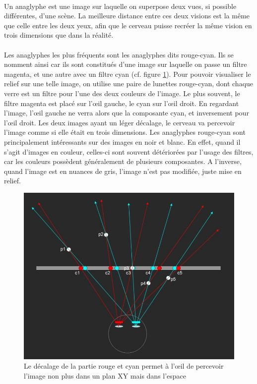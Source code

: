 \paragraph{}
	Un anaglyphe est une image sur laquelle on superpose deux vues, si possible différentes, d’une scène. La meilleure distance entre ces deux visions est la même que celle entre les deux yeux, afin que le cerveau puisse recréer la même vision en trois dimensions que dans la réalité.
	
\paragraph{}
	Les anaglyphes les plus fréquents sont les anaglyphes dits rouge-cyan. Ils se nomment ainsi car ils sont constitués d’une image sur laquelle on passe un filtre magenta, et une autre avec un filtre cyan (cf. figure \ref{fig:anaglyph}). Pour pouvoir visualiser le relief sur une telle image, on utilise une paire de lunettes rouge-cyan, dont chaque verre est un filtre pour l’une des deux couleurs de l’image. Le plus souvent, le filtre magenta est placé sur l’œil gauche, le cyan sur l’œil droit. En regardant l’image, l’œil gauche ne verra alors que la composante cyan, et inversement pour l’œil droit. Les deux images ayant un léger décalage, le cerveau va percevoir l’image comme si elle était en trois dimensions. Les anaglyphes rouge-cyan sont principalement intéressants sur des images en noir et blanc. En effet, quand il s’agit d’images en couleur, celles-ci sont souvent détériorées par l’usage des filtres, car les couleurs possèdent généralement de plusieurs composantes. A l’inverse, quand l’image est en nuances de gris, l’image n’est pas modifiée, juste mise en relief.

\begin{figure}[h]
		\centering
		\includegraphics[scale=0.7]{anaglyph.png}
		\caption{\label{fig:anaglyph} Le décalage de la partie rouge et cyan permet à l’œil de percevoir l’image non plus dans un plan XY mais dans l’espace \protect \footnotemark }
\end{figure}

